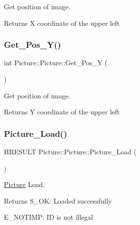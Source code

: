 Get position of image. 

\begin{DoxyReturn}{Returns}
X coordinate of the upper left 
\end{DoxyReturn}
\mbox{\label{class_picture_1_1_picture_a370ddd3fba418dbaeac72f649feec7a7}} 
\subsubsection{\texorpdfstring{Get\+\_\+\+Pos\+\_\+\+Y()}{Get\_Pos\_Y()}}
{\footnotesize\ttfamily int Picture\+::\+Picture\+::\+Get\+\_\+\+Pos\+\_\+Y (\begin{DoxyParamCaption}{ }\end{DoxyParamCaption})\hspace{0.3cm}{\ttfamily [inline]}}



Get position of image. 

\begin{DoxyReturn}{Returns}
Y coordinate of the upper left 
\end{DoxyReturn}
\mbox{\label{class_picture_1_1_picture_a5e5b20e0f0c261e3338ec23bc7c58252}} 
\subsubsection{\texorpdfstring{Picture\+\_\+\+Load()}{Picture\_Load()}}
{\footnotesize\ttfamily H\+R\+E\+S\+U\+LT Picture\+::\+Picture\+::\+Picture\+\_\+\+Load (\begin{DoxyParamCaption}{ }\end{DoxyParamCaption})\hspace{0.3cm}{\ttfamily [inline]}}



\hyperlink{class_picture_1_1_picture}{Picture} Load. 

\begin{DoxyReturn}{Returns}
S\+\_\+\+OK\+: Loaded successfully 

E\+\_\+\+N\+O\+T\+I\+MP\+: ID is not illegal 
\end{DoxyReturn}
\mbox{\label{class_picture_1_1_picture_a4044830d730f7c5f2039652f830b1bbb}} 
